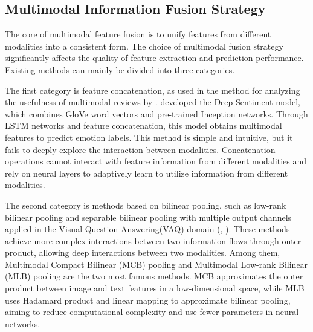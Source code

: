 \documentclass[preprint,12pt]{elsarticle}
\begin{document}
\subsection{Multimodal Information Fusion Strategy}

The core of multimodal feature fusion is to unify features from different modalities into a consistent form. The choice of multimodal fusion strategy significantly affects the quality of feature extraction and prediction performance. Existing methods can mainly be divided into three categories.

The first category is feature concatenation, as used in the method for analyzing the usefulness of multimodal reviews by \citet{ma2018effects}. \citet{hu2018multimodal} developed the Deep Sentiment model, which combines GloVe word vectors and pre-trained Inception networks. Through LSTM networks and feature concatenation, this model obtains multimodal features to predict emotion labels. This method is simple and intuitive, but it fails to deeply explore the interaction between modalities. Concatenation operations cannot interact with feature information from different modalities and rely on neural layers to adaptively learn to utilize information from different modalities.

The second category is methods based on bilinear pooling, such as low-rank bilinear pooling and separable bilinear pooling with multiple output channels applied in the Visual Question Answering(VAQ) domain (\citep{yu2017multi}, \citep{yu2018beyond}). These methods achieve more complex interactions between two information flows through outer product, allowing deep interactions between two modalities. Among them, Multimodal Compact Bilinear (MCB) pooling \citet{fukui2016multimodal} and Multimodal Low-rank Bilinear (MLB) pooling \citet{kim2016hadamard} are the two most famous methods. MCB approximates the outer product between image and text features in a low-dimensional space, while MLB uses Hadamard product and linear mapping to approximate bilinear pooling, aiming to reduce computational complexity and use fewer parameters in neural networks.
\end{document}
